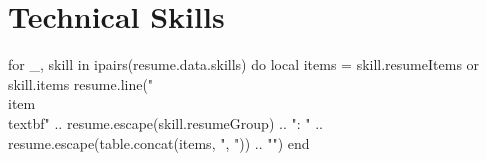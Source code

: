 \section{\textbf{Technical Skills}}
\begin{itemize}[leftmargin=0.05in, label={}, noitemsep, topsep=1mm]
\begin{luacode*}
for _, skill in ipairs(resume.data.skills) do
  local items = skill.resumeItems or skill.items
  resume.line("\\item{\\textbf{" .. resume.escape(skill.resumeGroup) .. "}{: " .. resume.escape(table.concat(items, ", ")) .. "}}")
end
\end{luacode*}
\end{itemize}
\vspace{0mm}
